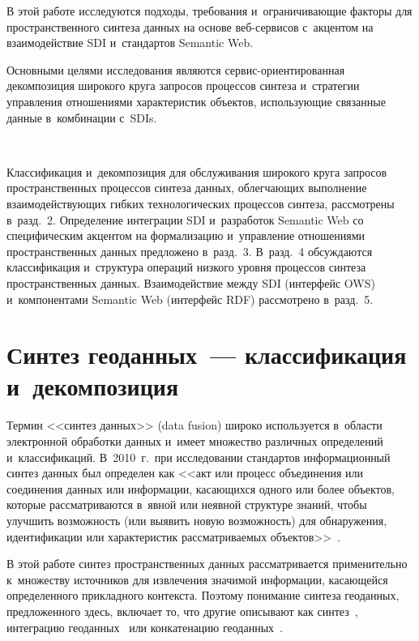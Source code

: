 \begin{multicols}{2}
     В этой работе исследуются подходы, требования и~ограничивающие 
факторы для пространственного синтеза данных на основе веб-сер\-ви\-сов 
с~акцентом на взаимодействие SDI и~стандартов Semantic Web. 

Основными 
целями исследования являются сер\-вис-ори\-ен\-ти\-ро\-ван\-ная декомпозиция 
широкого круга запросов процессов синтеза и~стратегии управ\-ле\-ния 
отношениями характеристик объектов, использующие связанные данные 
в~комбинации с~SDIs.

     \begin{figure*}[b] %
     \vspace*{1pt}
 \begin{center}  
  \mbox{%
 \epsfxsize=144.388mm 
 }
\end{center}
\vspace*{-11pt}
      \end{figure*}
     
     Классификация и~декомпозиция для обслуживания широкого круга 
запросов пространственных процессов синтеза данных, облегчающих 
выполнение взаимодействующих гибких технологических процессов синтеза, 
рассмотрены в~разд.~2. Определение интеграции SDI и~разработок Semantic 
Web со специфическим акцентом на формализацию и~управление отношениями 
пространственных данных предложено в~разд.~3.
В~разд.~4 обсуждаются классификация и~структура операций низкого уровня процессов
синтеза пространственных данных. Взаимодействие между SDI (интерфейс OWS)
и~компонентами Semantic Web (интерфейс RDF) рас\-смот\-ре\-но в~разд.~5.

\section{Синтез геоданных~--- классификация и~декомпозиция}

     Термин <<синтез данных>> (data fusion) широко используется в~области 
электронной обработки данных и~имеет множество различных определений 
и~классификаций. В~2010~г.\ при исследовании стандартов информационный 
синтез данных был определен как <<акт или процесс объединения или 
соединения данных или информации, касающихся одного или более объектов, 
которые рассматриваются в~явной или неявной структуре знаний, чтобы 
улучшить возможность (или выявить новую возможность) для обнаружения, 
идентификации или характеристик рассматриваемых объектов>>~\cite{1-dul}.
     
     В этой работе синтез пространственных данных рассматривается 
применительно к~множеству источников для извлечения значимой информации, 
касающейся определенного прикладного контекста. Поэтому понимание 
синтеза геоданных, предложенного здесь, включает то, что другие описывают 
как синтез~\cite{2-dul}, интеграцию геоданных~\cite{3-dul} или конкатенацию 
геоданных~\cite{4-dul}.
     

\end{multicols}
